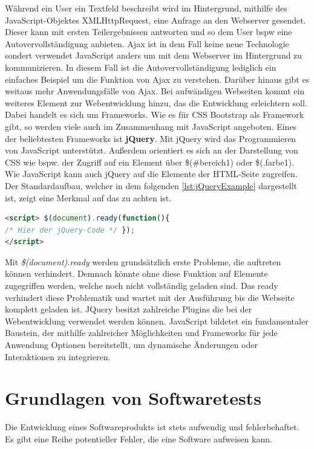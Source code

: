 \documentclass[a4paper,titlepage,halfparskip,12pt]{scrreprt}
\begin{document}
\begin{onehalfspacing}
Während ein User ein Textfeld beschreibt wird im Hintergrund, mithilfe des JavaScript-Objektes XMLHttpRequest, eine Anfrage an den Webserver gesendet. Dieser kann mit ersten Teilergebnissen antworten und so dem User bspw eine Autovervollständigung anbieten. Ajax ist in dem Fall keine neue Technologie sondert verwendet JavaScript anders um mit dem Webserver im Hintergrund zu kommunizieren. In diesem Fall ist die Autovervollständigung lediglich ein einfaches Beispiel um die Funktion von \ac{Ajax} zu verstehen. Darüber hinaus gibt es weitaus mehr Anwendungsfälle von \ac{Ajax}. Bei aufwändigen Webseiten kommt ein weiteres Element zur Webentwicklung hinzu, das die Entwicklung erleichtern soll. Dabei handelt es sich um Frameworks. Wie es für \ac{CSS} Bootstrap als Framework gibt, so werden viele auch im Zusammenhang mit JavaScript angeboten. Eines der beliebtesten Frameworks ist \textbf{jQuery}. Mit jQuery wird das Programmieren von JavaScript unterstützt. Außerdem orientiert es sich an der Darstellung von \ac{CSS} wie bspw. der Zugriff auf ein Element über \$(\dq \#bereich1\dq) oder \$(\dq .farbe1\dq). Wie JavaScript kann auch jQuery auf die Elemente der \ac{HTML}-Seite zugreifen. Der Standardaufbau, welcher in dem folgenden \autoref{lst:jQueryExample} dargestellt ist, zeigt eine Merkmal auf das zu achten ist.
\begin{lstlisting}[language=HTML,caption=Example Listing of jQuery,label={lst:jQueryExample}]
<script> $(document).ready(function(){
/* Hier der jQuery-Code */ });
</script>
\end{lstlisting}
Mit \textit{\$(document).ready} werden grundsätzlich erste Probleme, die auftreten können verhindert. Demnach könnte ohne diese Funktion auf Elemente zugegriffen werden, welche noch nicht vollständig geladen sind. Das ready verhindert diese Problematik und wartet mit der Ausführung bis die Webseite komplett geladen ist. JQuery besitzt zahlreiche Plugins die bei der Webentwicklung verwendet werden können. JavaScript bildetet ein fundamentaler Baustein, der mithilfe zahlreicher Möglichkeiten und Frameworks für jede Anwendung Optionen bereitstellt, um dynamische Änderungen oder Interaktionen zu integrieren.\cite{buhler2018webtechnologien}


\pagebreak
\section{Grundlagen von Softwaretests}
\label{sec:GrundlagenSoftwaretests}

Die Entwicklung eines Softwareprodukts ist stets aufwendig und fehlerbehaftet. Es gibt eine Reihe potentieller Fehler, die eine Software aufweisen kann.


\end{onehalfspacing}
\end{document}
